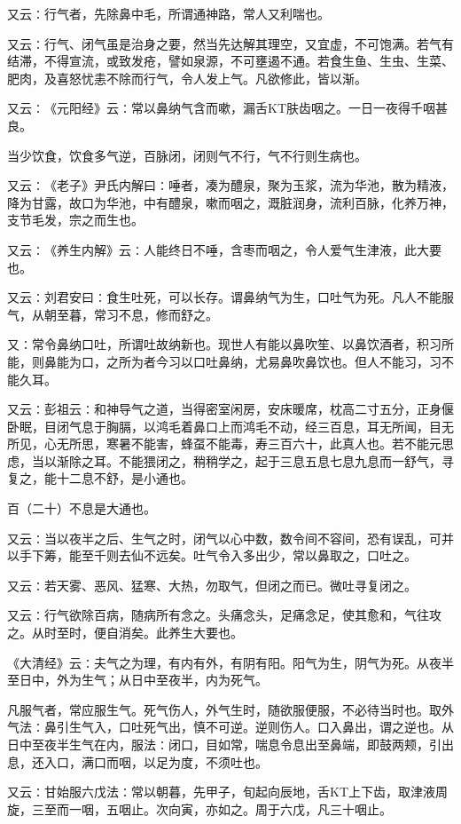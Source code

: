 \documentclass[a4paper,12pt,UTF8,twoside]{ctexbook}
\begin{document}
又云∶行气者，先除鼻中毛，所谓通神路，常人又利喘也。

又云∶行气、闭气虽是治身之要，然当先达解其理空，又宜虚，不可饱满。若气有结滞，不得宣流，或致发疮，譬如泉源，不可壅遏不通。若食生鱼、生虫、生菜、肥肉，及喜怒忧恚不除而行气，令人发上气。凡欲修此，皆以渐。

又云∶《元阳经》云∶常以鼻纳气含而嗽，漏舌KT肤齿咽之。一日一夜得千咽甚良。

当少饮食，饮食多气逆，百脉闭，闭则气不行，气不行则生病也。

又云∶《老子》尹氏内解曰∶唾者，凑为醴泉，聚为玉浆，流为华池，散为精液，降为甘露，故口为华池，中有醴泉，嗽而咽之，溉脏润身，流利百脉，化养万神，支节毛发，宗之而生也。

又云∶《养生内解》云∶人能终日不唾，含枣而咽之，令人爱气生津液，此大要也。

又云∶刘君安曰∶食生吐死，可以长存。谓鼻纳气为生，口吐气为死。凡人不能服气，从朝至暮，常习不息，修而舒之。

又∶常令鼻纳口吐，所谓吐故纳新也。现世人有能以鼻吹笙、以鼻饮酒者，积习所能，则鼻能为口，之所为者今习以口吐鼻纳，尤易鼻吹鼻饮也。但人不能习，习不能久耳。

又云∶彭祖云∶和神导气之道，当得密室闲房，安床暖席，枕高二寸五分，正身偃卧眠，目闭气息于胸膈，以鸿毛着鼻口上而鸿毛不动，经三百息，耳无所闻，目无所见，心无所思，寒暑不能害，蜂虿不能毒，寿三百六十，此真人也。若不能元思虑，当以渐除之耳。不能猥闭之，稍稍学之，起于三息五息七息九息而一舒气，寻复之，能十二息不舒，是小通也。

百（二十）不息是大通也。

又云∶当以夜半之后、生气之时，闭气以心中数，数令间不容间，恐有误乱，可并以手下筹，能至千则去仙不远矣。吐气令入多出少，常以鼻取之，口吐之。

又云∶若天雾、恶风、猛寒、大热，勿取气，但闭之而已。微吐寻复闭之。

又云∶行气欲除百病，随病所有念之。头痛念头，足痛念足，使其愈和，气往攻之。从时至时，便自消矣。此养生大要也。

《大清经》云∶夫气之为理，有内有外，有阴有阳。阳气为生，阴气为死。从夜半至日中，外为生气；从日中至夜半，内为死气。

凡服气者，常应服生气。死气伤人，外气生时，随欲服便服，不必待当时也。取外气法∶鼻引生气入，口吐死气出，慎不可逆。逆则伤人。口入鼻出，谓之逆也。从日中至夜半生气在内，服法∶闭口，目如常，喘息令息出至鼻端，即鼓两颊，引出息，还入口，满口而咽，以足为度，不须吐也。

又云∶甘始服六戊法∶常以朝暮，先甲子，旬起向辰地，舌KT上下齿，取津液周旋，三至而一咽，五咽止。次向寅，亦如之。周于六戊，凡三十咽止。
\end{document}
